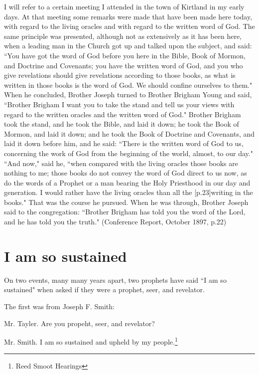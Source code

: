 \begin{displayquote}
I will refer to a certain meeting I attended in the town of Kirtland in my early 
days. At that meeting some remarks were made that have been made here today, with 
regard to the living oracles and with regard to the written word of God. The same 
principle was presented, although not as extensively as it has been here, when a 
leading man in the Church got up and talked upon the subject, and said: 
``You have got the word of God before you here in the Bible, Book of Mormon, and 
Doctrine and Covenants; you have the written word of God, and you who give 
revelations should give revelations according to those books, as what is written in 
those books is the word of God. We should confine ourselves to them." When he 
concluded, Brother Joseph turned to Brother Brigham Young and said, ``Brother 
Brigham I want you to take the stand and tell us your views with regard to the 
written oracles and the written word of God." Brother Brigham took the stand, and 
he took the Bible, and laid it down; he took the Book of Mormon, and laid it down; 
and he took the Book of Doctrine and Covenants, and laid it down before him, and he 
said: ``There is the written word of God to us, concerning the work of God from the 
beginning of the world, almost, to our day." ``And now," said he, ``when compared 
with the living oracles those books are nothing to me; those books do not convey 
the word of God direct to us now, as do the words of a Prophet or a man bearing the 
Holy Priesthood in our day and generation. I would rather have the living oracles 
than all the [p.23]writing in the books." That was the course he pursued. When he was 
through, Brother Joseph said to the congregation: ``Brother Brigham has told you the
word of the Lord, and he has told you the truth."  (Conference Report, 
  October 1897, p.22)
\end{displayquote}

\section{I am so sustained}

On two events, many many years apart, two prophets have said ``I am so sustained"
when asked if they were a prophet, seer, and revelator.

The first was from Joseph F. Smith:

\begin{displayquote}
Mr. Tayler. Are you propeht, seer, and revelator?

Mr. Smith. I am so sustained and upheld by my people.\footnote{Reed Smoot Hearings}
\end{displayquote}

